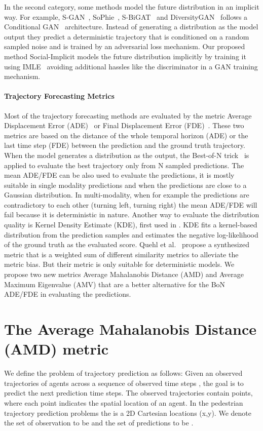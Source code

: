 \documentclass[runningheads]{llncs}
\begin{document}
In the second category, some methods model the future distribution in an implicit way.
For example, S-GAN~\cite{gupta2018social}, SoPhie~\cite{sadeghian2019sophie}, S-BiGAT~\cite{kosaraju2019social} and DiversityGAN~\cite{huang2020diversitygan} follows a Conditional GAN~\cite{gauthier2014conditional} architecture. 
Instead of generating a distribution as the model output they predict a deterministic trajectory that is conditioned on a random sampled noise and is trained by an adversarial loss mechanism. Our proposed method Social-Implicit models the future distribution implicitly by training it using IMLE~\cite{li2018implicit} avoiding additional hassles like the discriminator in a GAN training mechanism.
\paragraph{Trajectory Forecasting Metrics}
Most of the trajectory forecasting methods are evaluated by the metric Average Displacement Error (ADE)~\cite{pellegrini2009you} or Final Displacement Error (FDE)~\cite{alahi2016social}. 
These two metrics are based on the  distance of the whole temporal horizon (ADE) or the last time step (FDE) between the prediction and the ground truth trajectory. When the model generates a distribution as the output, the Best-of-N trick~\cite{gupta2018social} is applied to evaluate the best trajectory only from N sampled predictions. The mean ADE/FDE can be also used to evaluate the predictions, it is mostly suitable in single modality predictions and when the predictions are close to a Gaussian distribution. In multi-modality, when for example the predictions are contradictory to each other (turning left, turning right) the mean ADE/FDE will fail because it is deterministic in nature. Another way to evaluate the distribution quality is Kernel Density Estimate (KDE), first used in \cite{ivanovic2019trajectron}. KDE fits a kernel-based distribution from the prediction samples and estimates the negative log-likelihood of the ground truth as the evaluated score. Quehl et al.~\cite{quehl2017good} propose a synthesized metric that is a weighted sum of different similarity metrics to alleviate the metric bias. But their metric is only suitable for deterministic models. We propose two new metrics Average Mahalanobis Distance (AMD) and Average Maximum Eigenvalue (AMV) that are a better alternative for the BoN ADE/FDE in evaluating the predictions.

\section{The Average Mahalanobis Distance (AMD) metric}
We define the problem of trajectory prediction as follows: Given an observed trajectories of  agents across a sequence of observed time steps , the goal is to predict the next  prediction time steps. The observed trajectories contain  points, where each point indicates the spatial location of an agent. In the pedestrian trajectory prediction problems the  is a 2D Cartesian locations (x,y). We denote the set of observation to be  and the set of predictions to be .
\end{document}
